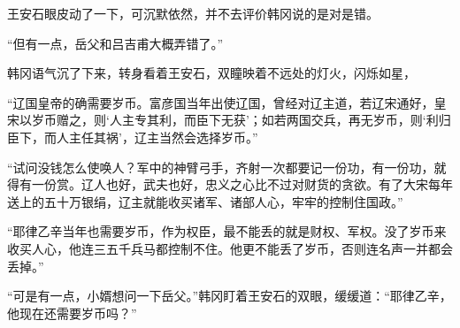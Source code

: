 王安石眼皮动了一下，可沉默依然，并不去评价韩冈说的是对是错。

“但有一点，岳父和吕吉甫大概弄错了。”

韩冈语气沉了下来，转身看着王安石，双瞳映着不远处的灯火，闪烁如星，

“辽国皇帝的确需要岁币。富彦国当年出使辽国，曾经对辽主道，若辽宋通好，皇宋以岁币赠之，则‘人主专其利，而臣下无获’；如若两国交兵，再无岁币，则‘利归臣下，而人主任其祸’，辽主当然会选择岁币。”

“试问没钱怎么使唤人？军中的神臂弓手，齐射一次都要记一份功，有一份功，就得有一份赏。辽人也好，武夫也好，忠义之心比不过对财货的贪欲。有了大宋每年送上的五十万银绢，辽主就能收买诸军、诸部人心，牢牢的控制住国政。”

“耶律乙辛当年也需要岁币，作为权臣，最不能丢的就是财权、军权。没了岁币来收买人心，他连三五千兵马都控制不住。他更不能丢了岁币，否则连名声一并都会丢掉。”

“可是有一点，小婿想问一下岳父。”韩冈盯着王安石的双眼，缓缓道：“耶律乙辛，他现在还需要岁币吗？”
